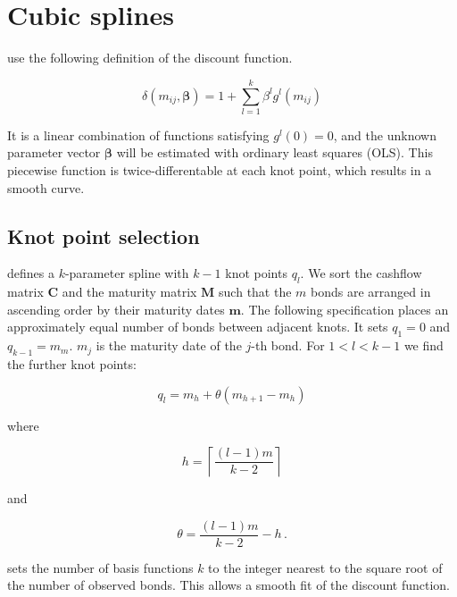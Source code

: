 \newpage
\section{Cubic splines}
\label{sec:cubic-splines}

\cite{McCulloch1971, McCulloch1975} use the following definition of the discount function.

\begin{equation}
  \label{eq:df_spline}
  \delta(m_{ij},\bm{\beta})=1+\sum_{l=1}^k\beta^lg^l(m_{ij})
\end{equation}

It is a linear combination of functions satisfying $g^l(0)=0$, and the unknown parameter vector $\bm{\beta}$ will be estimated with ordinary least squares (OLS). This piecewise function is twice-differentable at each knot point, which results in a smooth curve.

\subsection{Knot point selection}

\cite{McCulloch1975} defines a $k$-parameter spline with $k-1$ knot points $q_l$. We sort the cashflow matrix $\bm{C}$ and the maturity matrix $\bm{M}$ such that the $m$ bonds are arranged in ascending order by their maturity dates $\bm{m}$. The following specification places an approximately equal number of bonds between adjacent knots. It sets $q_1=0$ and $q_{k-1}=m_m$. $m_j$ is the maturity date of the $j$-th bond. For $1<l<k-1$ we find the further knot points:

\begin{equation*}
  \label{eq:A.1a}
  q_l = m_h+\theta(m_{h+1}-m_h)
\end{equation*}

where

\begin{equation*}
 \label{eq:A.1b}
  h = \left\lceil\frac{(l-1)m}{k-2}\right\rceil
\end{equation*}

and

\begin{equation*}
  \label{eq:A.1c}
  \theta = \frac{(l-1)m}{k-2}-h\,.
\end{equation*}

\cite{McCulloch1971} sets the  number of basis functions $k$ to the integer nearest to the square root of the number of observed bonds. This allows a smooth fit of the discount function.

